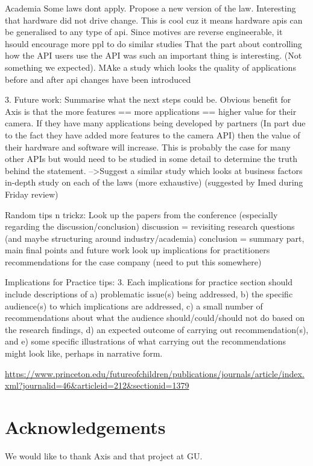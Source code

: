 \documentclass{sig-alternate}
\begin{document}
Academia
Some laws dont apply. Propose a new version of the law.
Interesting that hardware did not drive change. This is cool cuz it means hardware apis can be generalised to any type of api.
Since motives are reverse engineerable, it hsould encourage more ppl to do similar studies
That the part about controlling how the API users use the API was such an important thing is interesting. (Not something we expected). 
       MAke a study which looks the quality of applications before and after api changes have been introduced

3. Future work: Summarise what the next steps could be.
Obvious benefit for Axis is that the more features == more applications == higher value for their camera. If they have many applications being developed by partners (In part due to the fact they have added more features to the camera API) then the value of their hardware and software will increase. This is probably the case for many other APIs but would need to be studied in some detail to determine the truth behind the statement.
       -->Suggest a similar study which looks at business factors
 in-depth study on each of the laws (more exhaustive) (suggested by Imed during Friday review)

Random tips n trickz:
       Look up the papers from the conference (especially regarding the discussion/conclusion)
       discussion = revisiting research questions (and maybe structuring around industry/academia)
       conclusion = summary part, main final points and future work 
       look up implications for practitioners 
       recommendations for the case company (need to put this somewhere)



Implications for Practice tips: 
       3. Each implications for practice section should include descriptions of a) problematic issue(s) being addressed, b) the specific audience(s) to which implications are addressed, c) a small number of recommendations about what the audience should/could/should not do based on the research findings, d) an expected outcome of carrying out recommendation(s), and e) some specific illustrations of what carrying out the recommendations might look like, perhaps in narrative form.

\url{https://www.princeton.edu/futureofchildren/publications/journals/article/index.xml?journalid=46&articleid=212&sectionid=1379}



\section{Acknowledgements}
We would like to thank Axis and that project at GU. 


 
\end{document}
